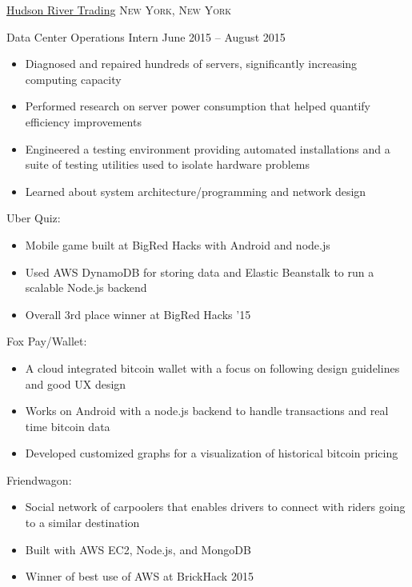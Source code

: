 \documentclass[11pt]{article}
\begin{document}
\headedsection  %
{\href{http://www.hudson-trading.com/}{Hudson River Trading}}
{\textsc{New York, New York}} {
    \headedsubsection
    {Data Center Operations Intern}
    {June 2015 -- August 2015}
    {
        \begin{itemize}
            \item Diagnosed and repaired hundreds of servers, significantly increasing computing capacity
            \item Performed research on server power consumption that helped quantify efficiency improvements
            \item Engineered a testing environment providing automated installations and a suite of testing utilities used to isolate hardware problems
            \item Learned about system architecture/programming and network design
        \end{itemize}
    }
}


\spacedhrule{0.1em}{0.9em}  %

\headedsubsection
{Uber Quiz:}{}
{
    \begin{itemize}[leftmargin=0.5in]
        \item{Mobile game built at BigRed Hacks with Android and node.js}
        \item{Used AWS DynamoDB for storing data and Elastic Beanstalk to run a scalable Node.js backend}
        \item{Overall 3rd place winner at BigRed Hacks '15}
    \end{itemize}
}

\headedsubsection %
{Fox Pay/Wallet:}{}
{
    \begin{itemize}[leftmargin=0.5in]
        \item{A cloud integrated bitcoin wallet with a focus on following design guidelines and good UX design}
        \item{Works on Android with a node.js backend to handle transactions and real time bitcoin data}
        \item{Developed customized graphs for a visualization of historical bitcoin pricing}
    \end{itemize}
}

\headedsubsection
{Friendwagon:}{}
{
    \begin{itemize}[leftmargin=0.5in]
        \item{Social network of carpoolers that enables drivers to connect with riders going to a similar destination}
        \item{Built with AWS EC2, Node.js, and MongoDB}
        \item{Winner of best use of AWS at BrickHack 2015}
    \end{itemize}
}
\end{document}
